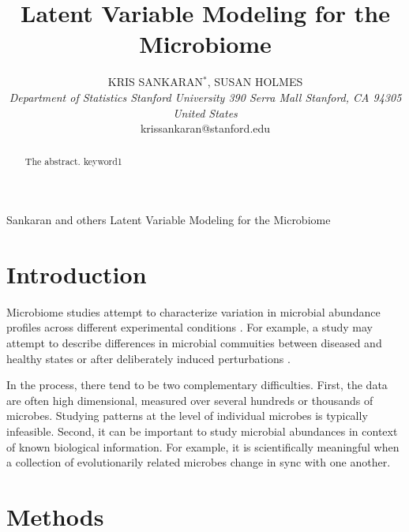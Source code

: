 \documentclass[oupdraft]{bio}
\begin{document}
\title{Latent Variable Modeling for the Microbiome}

\author{
  KRIS SANKARAN$^\ast$, SUSAN HOLMES\\[4pt]
  \textit{
    Department of Statistics
    Stanford University
    390 Serra Mall
    Stanford, CA 94305
    United States
  } \\[2pt]
  {krissankaran@stanford.edu}
}

\markboth
{Sankaran and others}
{Latent Variable Modeling for the Microbiome}

\maketitle


\begin{abstract}
  {
    The abstract.
  }
  {
    keyword1
  }
\end{abstract}

\section{Introduction}

Microbiome studies attempt to characterize variation in microbial
abundance profiles across different experimental conditions
\citep{human2012structure}. For example, a study may attempt to describe differences
in microbial commuities between diseased and healthy states or after
deliberately induced perturbations \citep{dethlefsen2011incomplete}.

In the process, there tend to be two complementary difficulties. First, the data
are often high dimensional, measured over several hundreds or thousands of
microbes. Studying patterns at the level of individual microbes is typically
infeasible. Second, it can be important to study microbial abundances in context
of known biological information. For example, it is scientifically meaningful
when a collection of evolutionarily related microbes change in sync with one
another.

\section{Methods}
\end{document}
